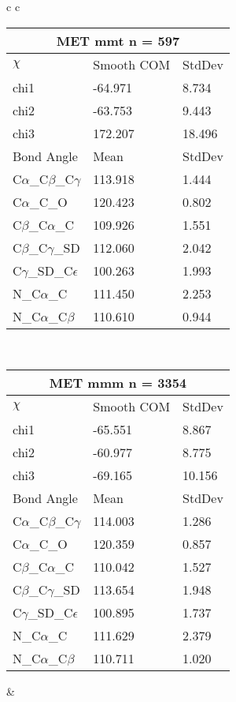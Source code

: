 \begin{longtable}{ c c }
\begin{tabular}{ l l l }
  \toprule
  \multicolumn{3}{c}{MET \textbf{mmt} n = 597} \\ \toprule
  $\chi$       & Smooth COM & StdDev \\ \midrule
  chi1 & -64.971 & 8.734 \\ 
  chi2 & -63.753 & 9.443 \\ 
  chi3 & 172.207 & 18.496 \\ \midrule
  Bond Angle   & Mean     & StdDev \\ \midrule
  C$\alpha$\_C$\beta$\_C$\gamma$ & 113.918 & 1.444\\
  C$\alpha$\_C\_O & 120.423 & 0.802\\
  C$\beta$\_C$\alpha$\_C & 109.926 & 1.551\\
  C$\beta$\_C$\gamma$\_SD & 112.060 & 2.042\\
  C$\gamma$\_SD\_C$\epsilon$ & 100.263 & 1.993\\
  N\_C$\alpha$\_C & 111.450 & 2.253\\
  N\_C$\alpha$\_C$\beta$ & 110.610 & 0.944\\
  \bottomrule
  \end{tabular}
  \\
  \begin{tabular}{ l l l }
  \toprule
  \multicolumn{3}{c}{MET \textbf{mmm} n = 3354} \\ \toprule
  $\chi$       & Smooth COM & StdDev \\ \midrule
  chi1 & -65.551 & 8.867 \\ 
  chi2 & -60.977 & 8.775 \\ 
  chi3 & -69.165 & 10.156 \\ \midrule
  Bond Angle   & Mean     & StdDev \\ \midrule
  C$\alpha$\_C$\beta$\_C$\gamma$ & 114.003 & 1.286\\
  C$\alpha$\_C\_O & 120.359 & 0.857\\
  C$\beta$\_C$\alpha$\_C & 110.042 & 1.527\\
  C$\beta$\_C$\gamma$\_SD & 113.654 & 1.948\\
  C$\gamma$\_SD\_C$\epsilon$ & 100.895 & 1.737\\
  N\_C$\alpha$\_C & 111.629 & 2.379\\
  N\_C$\alpha$\_C$\beta$ & 110.711 & 1.020\\
  \bottomrule
  \end{tabular}
  &
  \\
  
\end{longtable}    

